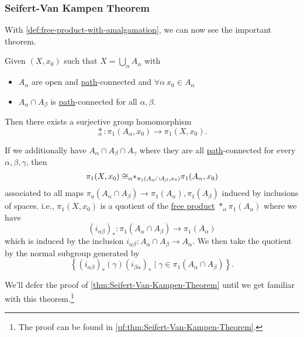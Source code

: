 \subsubsection{Seifert-Van Kampen Theorem}
With \autoref{def:free-product-with-amalgamation}, we can now see the important theorem.
\begin{theorem}\label{thm:Seifert-Van-Kampen-Theorem}
	Given \((X, x_0)\) such that \(X = \bigcup\limits_{\alpha } A_{\alpha }\) with
	\begin{itemize}
		\item \(A_{\alpha }\) are open and \hyperref[def:path]{path}-connected and \(\forall \alpha \ x_0\in A_{\alpha }\)
		\item \(A_{\alpha }\cap A_{\beta }\) is \hyperref[def:path]{path}-connected for all \(\alpha, \beta  \).
	\end{itemize}
	Then there exists a surjective group homomorphism
	\[
		\underset{\alpha }{\ast}\colon \pi _1(A_{\alpha }, x_0)\to \pi _1(X, x_0).
	\]

	\par If we additionally have \(A_{\alpha }\cap A_{\beta}\cap A_{\gamma}\) where they are all \hyperref[def:path]{path}-connected for every \(\alpha , \beta , \gamma\), then
	\[
		\pi _1(X, x_0)\cong _{\alpha }\hspace{-0.3em}\ast_{\pi _1(A_{\alpha }\cap A_{\beta }, x_0)}{}\pi _1(A_{\alpha }, x_0)
	\]
	associated to all maps \(\pi _a(A_{\alpha }\cap A_{\beta }) \to \pi _1 (A_{\alpha }), \pi _1(A_{\beta })\) induced by inclusions of spaces. i.e., \(\pi _1(X, x_0)\)
	is a quotient of the \hyperref[def:free-product-with-amalgamation]{free product} \(\ast_{\alpha}\pi _1(A_{\alpha })\) where we have
	\[
		(i_{\alpha \beta })_\ast\colon \pi _1(A_{\alpha }\cap A_{\beta })\to \pi _1(A_\alpha )
	\]
	which is induced by the inclusion \(i_{\alpha \beta }\colon A_{\alpha}\cap A_{\beta }\to A_{\alpha }\). We then take the quotient by the normal subgroup generated by
	\[
		\left\{(i_{\alpha \beta })_{\ast}(\gamma)(i_{\beta \alpha })_{\ast} \mid \gamma\in \pi _1(A_{\alpha }\cap A_{\beta })\right\}.
	\]
\end{theorem}
We'll defer the proof of \autoref{thm:Seifert-Van-Kampen-Theorem} until we get familiar with this theorem.\footnote{The proof can be found in \autoref{pf:thm:Seifert-Van-Kampen-Theorem}.}
